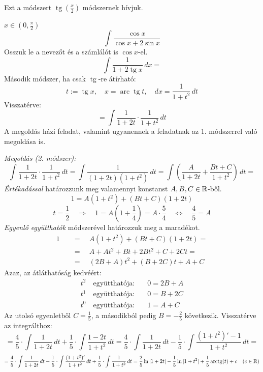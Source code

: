 \documentclass[a4paper,11.5pt]{article}
\DeclareMathOperator{\tg}{tg}
\DeclareMathOperator{\arc}{arc}
\DeclareMathOperator{\arctg}{arc tg}
\begin{document}
	\begin{note}
		Ezt a módszert $\tg\left(\frac{x}{2}\right)$ módszernek hívjuk.
	\end{note}
	\begin{exercise}$x\in\left(0,\frac{\pi}{2}\right)$
		\[ \int\frac{\cos x}{\cos x+2\sin x}\]
		Osszuk le a nevezőt és a számlálót is $\cos x$-el.
		\[ \int\frac{1}{1+2\tg x}\,dx= \]
		Második módszer, ha csak $\tg$-re átírható:
		\[ t:=\tg x,\quad x=\arc\tg t,\quad dx=\frac{1}{1+t^2}\,dt \]
		Visszatérve:
		\[ =\int\frac{1}{1+2t}\cdot\frac{1}{1+t^2}\,dt \]
		A megoldás házi feladat, valamint ugyanennek a feladatnak az 1. módszerrel való megoldása is.
		
		\textit{Megoldás (2. módszer):} 
		\[ \int\frac{1}{1+2t}\cdot\frac{1}{1+t^2}\,dt=\int\frac{1}{(1+2t)(1+t^2)}\,dt=\int\left(\frac{A}{1+2t}+\frac{Bt+C}{1+t^2}\right)\,dt= \]
		\textit{Értékadással} határozzunk meg valamennyi konstanst $A,B,C\in\mathbb{R}$-ből.
		\[ 1=A(1+t^2)+(Bt+C)(1+2t) \]
		\[ t=\frac{1}{2}\quad \Rightarrow\quad 1=A\left(1+\frac{1}{4}\right)=A\cdot\frac{5}{4}\quad \Leftrightarrow\quad \frac{4}{5}=A \]
		\textit{Egyenlő együtthatók} módszerével határozzuk meg a maradékot.
		\begin{align*}
			1\quad &=\quad A(1+t^2)+(Bt+C)(1+2t)=\\
				   &=\quad A+At^2+Bt+2Bt^2+C+2Ct=\\
				   &=\quad (2B+A)t^2+(B+2C)t+A+C
		\end{align*}
		Azaz, az átláthatóság kedvéért:
		\begin{align*}
		t^2 \quad \text{együtthatója:}&\quad  0=2B+A\\
		t^1 \quad \text{együtthatója:}&\quad  0=B+2C\\
		t^0 \quad \text{együtthatója:}&\quad  1=A+C
		\end{align*}
		Az utolsó egyenletből $C=\frac{1}{5}$, a másodikból pedig $B=-\frac{2}{5}$ következik. Visszatérve az integrálthoz:
		\[ =\frac{4}{5}\cdot\int\frac{1}{1+2t}\,dt+\frac{1}{5}\cdot\int\frac{1-2t}{1+t^2}\,dt=\frac{4}{5}\cdot\int\frac{1}{1+2t}\,dt-\frac{1}{5}\cdot\int\frac{(1+t^2)'-1}{1+t^2}\,dt=\]
		\[=\frac{4}{5}\cdot\int\frac{1}{1+2t}\,dt-\frac{1}{5}\cdot\int\frac{(1+t^2)'}{1+t^2}\,dt+\frac{1}{5}\cdot\int\frac{1}{1+t^2}\,dt=\frac{2}{5}\ln|1+2t|-\frac{1}{5}\ln|1+t^2|+\frac{1}{5}\arctg(t)+c\quad (c\in\R) \]
	\end{exercise}
\end{document}
